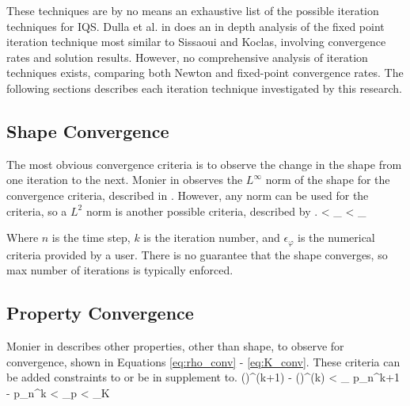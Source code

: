 These techniques are by no means an exhaustive list of the possible iteration techniques for IQS. Dulla et al. in \cite{Dulla2008} does an in depth analysis of the fixed point iteration technique most similar to Sissaoui and Koclas, involving convergence rates and solution results.  However, no comprehensive analysis of iteration techniques exists, comparing both Newton and fixed-point convergence rates.  The following sections describes each iteration technique investigated by this research.

\subsection{Shape Convergence}

The most obvious convergence criteria is to observe the change in the shape from one iteration to the next.  Monier in \cite{Monier_diss} observes the $L^{\infty}$ norm of the shape for the convergence criteria, described in .  However, any norm can be used for the criteria, so a $L^2$ norm is another possible criteria, described by .
\be
{} < \epsilon_{\varphi}
\label{eq:shape_Linf}
\ee 
\be
{} < \epsilon_{\varphi}
\label{eq:shape_L2}
\ee 

Where $n$ is the time step, $k$ is the iteration number, and $\epsilon_{\varphi}$ is the numerical criteria provided by a user.  There is no guarantee that the shape converges, so max number of iterations is typically enforced.


\subsection{Property Convergence}

Monier in \cite{Monier_diss} describes other properties, other than shape, to observe for convergence, shown in Equations \eqref{eq:rho_conv} - \eqref{eq:K_conv}.  These criteria can be added constraints to  or be in supplement to.
\be
\left(\frac{\rho}{\Lambda}\right)^{(k+1)} - \left(\frac{\rho}{\Lambda}\right)^{(k)} < \epsilon_{\rho}
\label{eq:rho_conv}
\ee
\be 
p_n^{k+1} - p_n^{k} < \epsilon_p
\label{eq:p_conv}
\ee
\be 
{} < \epsilon_K
\label{eq:K_conv}
\ee

